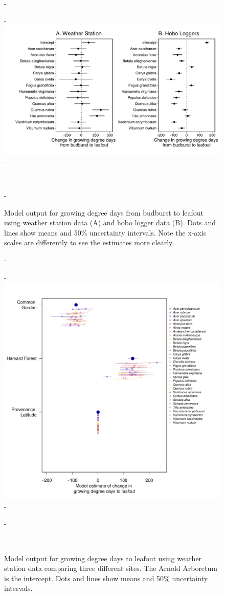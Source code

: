\documentclass{article}\usepackage[]{graphicx}\usepackage[]{color}
\begin{document}
{{\begin{figure} [H]
  -\begin{center}
  -\includegraphics[width=16cm]{..//analyses/figures/muplot_compare_dvr.pdf}
  -\caption{Model output for growing degree days from budburst to leafout using weather station data (A) and hobo logger data (B). Dots and lines show means and 50\% uncertainty intervals. Note the x-axis scales are differently to see the estimates more clearly.}\label{fig:dvr}
  -\end{center}
  -\end{figure}}
  
{\begin{figure} [H]
  -\begin{center}
  -\includegraphics[width=12cm]{..//analyses/figures/site_prov_all.pdf}
  -\caption{Model output for growing degree days to leafout using weather station data comparing three different sites. The Arnold Arboretum is the intercept. Dots and lines show means and 50\% uncertainty intervals.}\label{fig:allsites}
  -\end{center}
  -\end{figure}}

}
\end{document}
